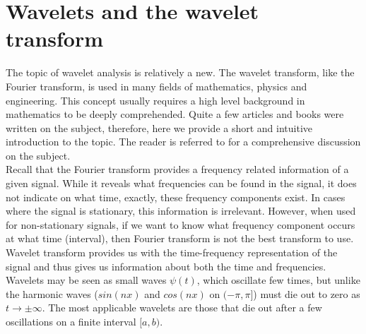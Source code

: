 %

\chapter{Wavelets and the wavelet transform}

The topic of wavelet analysis is relatively a new. The wavelet transform, like the Fourier transform, is used in many fields of mathematics, physics and engineering. This concept usually requires a high level background in mathematics to be deeply comprehended. Quite a few articles and books were written on the subject, therefore, here we provide a short and intuitive introduction to the topic. The reader is referred to \cite{meyer1992wavelets} for a comprehensive discussion on the subject.\\ 

Recall that the Fourier transform provides a frequency related information of a given signal. While it reveals what frequencies can be found in the signal, it does not indicate on what time, exactly, these frequency components exist. In cases where the signal is stationary, this information is irrelevant. However, when used for non-stationary signals, if we want to know what frequency component occurs at what time (interval), then Fourier transform is not the best transform to use. Wavelet transform provides us with the time-frequency representation of the signal and thus gives us information about both the time and frequencies.\\

Wavelets may be seen as small waves $\psi(t)$, which oscillate few times, but unlike the harmonic waves ($sin(nx)$ and $cos(nx)$ on $(-\pi,\pi]$) must die out to zero as $t \rightarrow \pm\infty$. The most applicable wavelets are those that die out after a few oscillations on a finite interval $[a,b)$. \\


